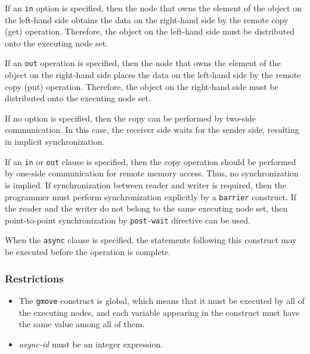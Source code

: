 If an {\tt in} option is specified, then the node that owns the element of
the object on the left-hand side obtains the data on the right-hand side by the 
remote copy (get) operation. Therefore, the object on the left-hand side
must be distributed onto the executing node set. 

If an {\tt out} operation is specified, then the node that owns the element
of the object on the right-hand side places the data on the left-hand side by the
remote copy (put) operation. Therefore, the object on the right-hand side
must be distributed onto the executing node set.

If no option is specified, then the copy can be performed by two-side
communication. In this case, the receiver side waits for the sender side,
resulting in implicit synchronization. 

If an {\tt in} or {\tt out} clause is specified, then the
copy operation should be performed by one-side communication for remote
memory access. Thus, no synchronization is implied. If
synchronization between reader and writer is required, then the programmer
must perform synchronization explicitly by a {\tt barrier} construct. If the reader
and the writer do not belong to the same executing node set, then
point-to-point synchronization by {\tt post-wait} directive can be used.

When the {\tt async} clause is specified, the statements following this
construct may be executed before the operation is complete.

\subsubsection*{Restrictions}

\begin{itemize}
 \item The {\tt gmove} construct is global, which means that it must be
       executed by all of the executing nodes, and each variable
       appearing in the construct must have the same value among all of
       them.
\item {\it async-id} must be an integer expression.
\end{itemize}

